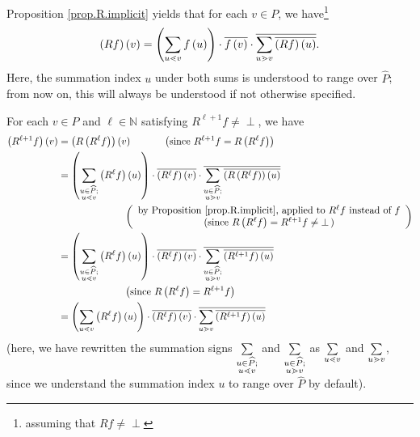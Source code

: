 \documentclass[numbers=enddot,12pt,final,onecolumn,notitlepage]{scrartcl}%
\theoremstyle{definition}
\newenvironment{verlong}{}{}
\newcommand{\undf}{\operatorname*{\bot}}
\let\sumnonlimits\sum
\renewcommand{\sum}{\sumnonlimits\limits}
\begin{document}
\begin{verlong}
Proposition \ref{prop.R.implicit} yields that for each $v\in P$, we
have\footnote{assuming that $Rf\neq\undf$}%
\begin{equation}
\left(  Rf\right)  \left(  v\right)  =\left(  \sum\limits_{u\lessdot
v}f\left(  u\right)  \right)  \cdot\overline{f\left(  v\right)  }%
\cdot\overline{\sum\limits_{u\gtrdot v}\overline{\left(  Rf\right)  \left(
u\right)  }}.
\end{equation}
Here, the summation index $u$ under both sums is understood to range over
$\widehat{P}$; from now on, this will always be understood if not otherwise specified.

For each $v\in P$ and $\ell\in\mathbb{N}$ satisfying $R^{\ell+1}f\neq\undf$,
we have%
\begin{align*}
\left(  R^{\ell+1}f\right)  \left(  v\right)   &  =\left(  R\left(  R^{\ell
}f\right)  \right)  \left(  v\right)  \ \ \ \ \ \ \ \ \ \ \left(  \text{since
}R^{\ell+1}f=R\left(  R^{\ell}f\right)  \right) \\
&  =\left(  \sum\limits_{\substack{u\in\widehat{P};\\u\lessdot v}}\left(
R^{\ell}f\right)  \left(  u\right)  \right)  \cdot\overline{\left(  R^{\ell
}f\right)  \left(  v\right)  }\cdot\overline{\sum\limits_{\substack{u\in
\widehat{P};\\u\gtrdot v}}\overline{\left(  R\left(  R^{\ell}f\right)
\right)  \left(  u\right)  }}\\
&  \ \ \ \ \ \ \ \ \ \ \ \ \ \ \ \ \ \ \ \ \left(
\begin{array}
[c]{c}%
\text{by Proposition \ref{prop.R.implicit}, applied to }R^{\ell}f\text{
instead of }f\\
\text{(since }R\left(  R^{\ell}f\right)  =R^{\ell+1}f\neq\undf\text{)}%
\end{array}
\right) \\
&  =\left(  \sum\limits_{\substack{u\in\widehat{P};\\u\lessdot v}}\left(
R^{\ell}f\right)  \left(  u\right)  \right)  \cdot\overline{\left(  R^{\ell
}f\right)  \left(  v\right)  }\cdot\overline{\sum\limits_{\substack{u\in
\widehat{P};\\u\gtrdot v}}\overline{\left(  R^{\ell+1}f\right)  \left(
u\right)  }}\\
&  \ \ \ \ \ \ \ \ \ \ \ \ \ \ \ \ \ \ \ \ \left(  \text{since }R\left(
R^{\ell}f\right)  =R^{\ell+1}f\right) \\
&  =\left(  \sum\limits_{u\lessdot v}\left(  R^{\ell}f\right)  \left(
u\right)  \right)  \cdot\overline{\left(  R^{\ell}f\right)  \left(  v\right)
}\cdot\overline{\sum\limits_{u\gtrdot v}\overline{\left(  R^{\ell+1}f\right)
\left(  u\right)  }}%
\end{align*}
(here, we have rewritten the summation signs $\sum\limits_{\substack{u\in
\widehat{P};\\u\lessdot v}}$ and $\sum\limits_{\substack{u\in\widehat{P}%
;\\u\gtrdot v}}$ as $\sum\limits_{u\lessdot v}$ and $\sum\limits_{u\gtrdot v}%
$, since we understand the summation index $u$ to range over $\widehat{P}$ by default).
\end{verlong}
\end{document}
